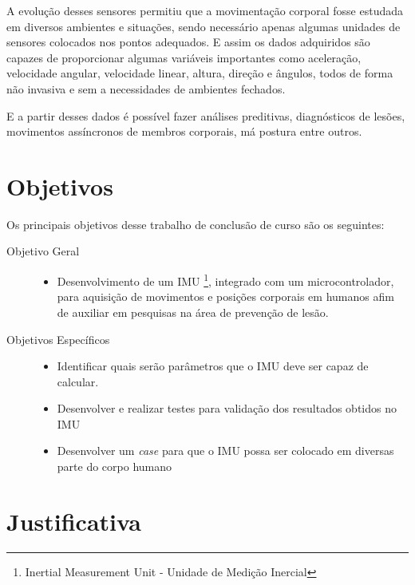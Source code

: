 A evolução desses sensores permitiu que a movimentação corporal fosse estudada em diversos ambientes e situações, sendo necessário apenas algumas unidades de sensores colocados nos pontos adequados. E assim os dados adquiridos são capazes de proporcionar algumas variáveis importantes como aceleração, velocidade angular, velocidade linear, altura, direção e ângulos, todos de forma não invasiva
e sem a necessidades de ambientes fechados\cite{chang2016}.

E a partir desses dados é possível fazer análises preditivas, diagnósticos de lesões, movimentos assíncronos de membros corporais, má postura entre outros.



\section{Objetivos}

Os principais objetivos desse trabalho de conclusão de curso são os seguintes:

\begin{description}
	\item [Objetivo Geral]
	
	\begin{itemize}
		\item Desenvolvimento de um IMU \footnote{Inertial Measurement Unit - Unidade de Medição Inercial}, integrado com um microcontrolador, para aquisição de movimentos e posições corporais em humanos afim de auxiliar em pesquisas na área de prevenção de lesão.
	\end{itemize}
		
	\item [Objetivos Específicos] 
	\begin{itemize} 
		\item Identificar quais serão parâmetros que o IMU deve ser capaz de calcular. 
		
		\item Desenvolver e realizar testes para validação dos resultados obtidos no IMU
		
		\item Desenvolver um \textit{case} para que o IMU possa ser colocado em diversas parte do corpo humano
		
		
	\end{itemize}
\end{description}

\section{Justificativa}

